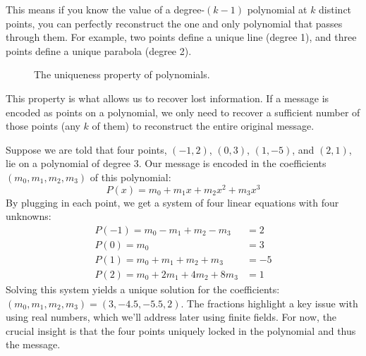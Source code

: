 \documentclass{article}
\begin{document}
This means if you know the value of a degree-$(k-1)$ polynomial at $k$ distinct points, you can perfectly reconstruct the one and only polynomial that passes through them. For example, two points define a unique line (degree 1), and three points define a unique parabola (degree 2).

\begin{figure}[h!]
\centering
{}
\caption{The uniqueness property of polynomials.}
\end{figure}

This property is what allows us to recover lost information. If a message is encoded as points on a polynomial, we only need to recover a sufficient number of those points (any $k$ of them) to reconstruct the entire original message.

\begin{tcolorbox}[title={Example: Reconstructing a Polynomial}]
Suppose we are told that four points, $(-1, 2)$, $(0, 3)$, $(1, -5)$, and $(2, 1)$, lie on a polynomial of degree 3. Our message is encoded in the coefficients $(m_0, m_1, m_2, m_3)$ of this polynomial:
\[ P(x) = m_0 + m_1 x + m_2 x^2 + m_3 x^3 \]
By plugging in each point, we get a system of four linear equations with four unknowns:
\begin{align*}
P(-1) = m_0 - m_1 + m_2 - m_3 &= 2 \\
P(0)  = m_0 &= 3 \\
P(1)  = m_0 + m_1 + m_2 + m_3 &= -5 \\
P(2)  = m_0 + 2m_1 + 4m_2 + 8m_3 &= 1
\end{align*}
Solving this system yields a unique solution for the coefficients: $(m_0, m_1, m_2, m_3) = (3, -4.5, -5.5, 2)$. The fractions highlight a key issue with using real numbers, which we'll address later using finite fields. For now, the crucial insight is that the four points uniquely locked in the polynomial and thus the message.
\end{tcolorbox}
\end{document}

